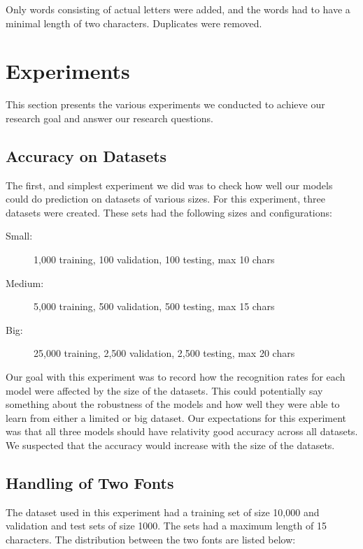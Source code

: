 Only words consisting of actual letters were added, and the words had to have a minimal length of two characters. Duplicates were removed.


\section{Experiments}
\label{sec:experiments_details}
This section presents the various experiments we conducted to achieve our research goal and answer our research questions.

\subsection{Accuracy on Datasets}
\label{sec:accuracy_on_datasets}
The first, and simplest experiment we did was to check how well our models could do prediction on datasets of various sizes. For this experiment, three datasets were created. These sets had the following sizes and configurations:

\begin{description}
    \item[Small:]{1,000 training, 100 validation, 100 testing, max 10 chars}
    \item[Medium:]{5,000 training, 500 validation, 500 testing, max 15 chars}
    \item[Big:]{25,000 training, 2,500 validation, 2,500 testing, max 20 chars}
\end{description}

Our goal with this experiment was to record how the recognition rates for each model were affected by the size of the datasets. This could potentially say something about the robustness of the models and how well they were able to learn from either a limited or big dataset. Our expectations for this experiment was that all three models should have relativity good accuracy across all datasets. We suspected that the accuracy would increase with the size of the datasets.

\subsection{Handling of Two Fonts}
The dataset used in this experiment had a training set of size 10,000 and validation and test sets of size 1000. The sets had a maximum length of 15 characters. The distribution between the two fonts are listed below:


